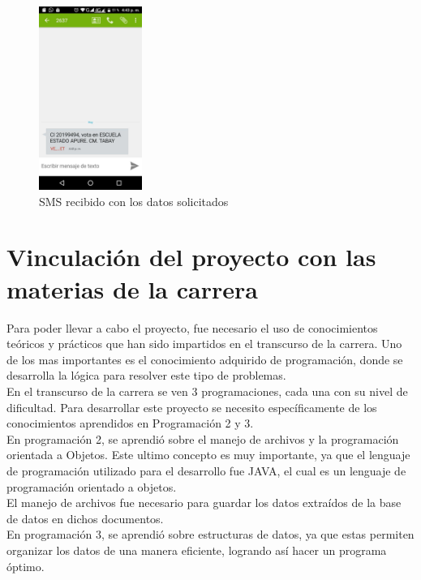 \documentclass[12pt,oneside]{book}
\begin{document}
	\begin{figure}[H]
		\centering
		\includegraphics[width=0.3\textwidth]{pruebatlf.jpg}
		\caption{SMS recibido con los datos solicitados}
		\label{p1}
	\end{figure}

	
	\section{Vinculación del proyecto con las materias de la carrera}
	
	Para poder llevar a cabo el proyecto, fue necesario el uso de conocimientos teóricos y prácticos que han sido impartidos en el transcurso de la carrera. Uno de los mas importantes es el conocimiento adquirido de programación, donde se desarrolla la lógica para resolver este tipo de problemas.\\
	
	En el transcurso de la carrera se ven 3 programaciones, cada una con su nivel de dificultad. Para desarrollar este proyecto se necesito específicamente de los conocimientos aprendidos en Programación 2 y 3.\\
	
	En programación 2, se aprendió sobre el manejo de archivos y la programación orientada a Objetos. Este ultimo concepto es muy importante, ya que el lenguaje de programación utilizado para el desarrollo fue JAVA, el cual es un lenguaje de programación orientado a objetos.\\
	
	 El manejo de archivos fue necesario para guardar los datos extraídos de la base de datos en dichos documentos.\\
	
	En programación 3, se aprendió sobre estructuras de datos, ya que estas permiten organizar los datos de una manera eficiente, logrando así hacer un programa óptimo.\\
	
\end{document}
